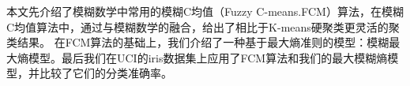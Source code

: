 \begin{cnabstract}
本文先介绍了模糊数学中常用的模糊C均值（Fuzzy C-means.FCM）算法，在模糊C均值算法中，通过与模糊数学的融合，给出了相比于K-means硬聚类更灵活的聚类结果。
在FCM算法的基础上，我们介绍了一种基于最大熵准则的模型：模糊最大熵模型。最后我们在UCI的iris数据集上应用了FCM算法和我们的最大模糊熵模型，并比较了它们的分类准确率。
\end{cnabstract}
\renewcommand{\abstractname}{Abstract}
